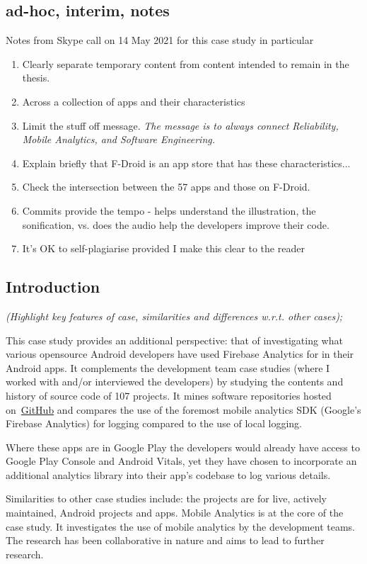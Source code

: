 \subsection*{ad-hoc, interim, notes}
Notes from Skype call on 14 May 2021 for this case study in particular
\begin{enumerate}
    \item  Clearly separate temporary content from content intended to remain in the thesis.
    \item  Across a collection of apps and their characteristics
    \item  Limit the stuff off message. \textit{The message is to always connect Reliability, Mobile Analytics, and Software Engineering.}
    \item  Explain briefly that F-Droid is an app store that has these characteristics... 
    \item  Check the intersection between the 57 apps and those on F-Droid.
    \item  Commits provide the tempo - helps understand the illustration, the sonification, vs. does the audio help the developers improve their code.
    \item  It's OK to self-plagiarise provided I make this clear to the reader
\end{enumerate}


\subsection{Introduction}
\emph{(Highlight key features of case, similarities and differences w.r.t. other cases);}

This case study provides an additional perspective: that of investigating what various opensource Android developers have used Firebase Analytics for in their Android apps. It complements the development team case studies (where I worked with and/or interviewed the developers) by studying the contents and history of source code of 107 projects. It mines software repositories hosted on~\href{https://github.com/}{GitHub} and compares the use of the foremost mobile analytics SDK (Google's Firebase Analytics) for logging compared to the use of local logging.

Where these apps are in Google Play the developers would already have access to Google Play Console and Android Vitals, yet they have chosen to incorporate an additional analytics library into their app's codebase to log various details. 

Similarities to other case studies include: the projects are for live, actively maintained, Android projects and apps. Mobile Analytics is at the core of the case study. It investigates the use of mobile analytics by the development teams. The research has been collaborative in nature and aims to lead to further research.

